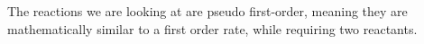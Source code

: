 The reactions we are looking at are pseudo first-order, meaning they are mathematically similar to a first order rate, while requiring two reactants.